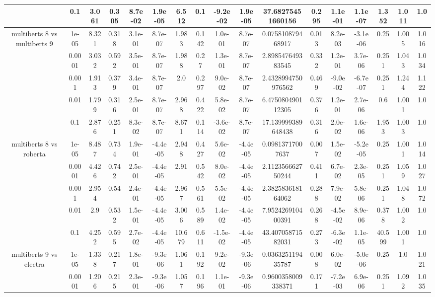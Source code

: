 \begin{tabular}{|c|c|c|c|c|c|c|c|c|c|c|c|c|c|c|c|c|}
 & 0.1 & 3.061 & 0.305 & 8.7e-02 & 1.9e-05 & 6.512 & 0.1 & -9.2e-02 & 1.9e-05 & 37.68275451660156 & 0.295 & 1.1e-01 & 1.1e-07 & 1.352 & 1.011 & 1.0 \\
\hline
\multirow{5}{*}{multiberts 8 vs multiberts 9} & 1e-05 & 8.321 & 0.318 & 3.1e-01 & 8.7e-07 & 1.983 & 0.142 & 1.0e-01 & 8.7e-07 & 0.075810879468917 & 0.013 & 8.2e-03 & -3.1e-06 & 0.25 & 1.005 & 1.016 \\
 & 0.0001 & 3.032 & 0.592 & 3.5e-01 & 8.7e-07 & 1.988 & 0.27 & 1.3e-01 & 8.7e-07 & 2.898547649383545 & 0.332 & 1.2e-01 & 3.7e-06 & 0.251 & 1.043 & 1.034 \\
 & 0.001 & 1.913 & 0.379 & 3.4e-01 & 8.7e-07 & 2.0 & 0.297 & 9.0e-02 & 8.7e-07 & 2.4328994750976562 & 0.469 & -9.0e-02 & -6.7e-07 & 0.251 & 1.244 & 1.122 \\
 & 0.01 & 1.799 & 0.316 & 2.5e-01 & 8.7e-07 & 2.968 & 0.422 & 5.8e-02 & 8.7e-07 & 6.475080490112305 & 0.376 & 1.2e-01 & 2.7e-06 & 0.6 & 1.001 & 1.0 \\
 & 0.1 & 2.876 & 0.251 & 8.3e-02 & 8.7e-07 & 8.671 & 0.114 & -3.6e-02 & 8.7e-07 & 17.139999389648438 & 0.316 & 2.0e-02 & 1.6e-06 & 1.953 & 1.003 & 1.0 \\
\hline
\multirow{5}{*}{multiberts 8 vs roberta } & 1e-05 & 8.487 & 0.734 & 1.9e-01 & -4.4e-05 & 2.948 & 0.427 & 5.6e-02 & -4.4e-05 & 0.09813717007637 & 0.007 & 1.5e-02 & -5.2e-05 & 0.25 & 1.001 & 1.014 \\
 & 0.0001 & 4.426 & 0.742 & 2.5e-01 & -4.4e-05 & 2.91 & 0.542 & 8.0e-02 & -4.4e-05 & 2.112356662750244 & 0.411 & 6.7e-02 & 2.3e-05 & 0.251 & 1.059 & 1.027 \\
 & 0.001 & 2.954 & 0.54 & 2.4e-01 & -4.4e-05 & 2.967 & 0.561 & 5.5e-02 & -4.4e-05 & 2.382583618164062 & 0.288 & 7.9e-02 & 5.8e-06 & 0.251 & 1.048 & 1.072 \\
 & 0.01 & 2.9 & 0.532 & 1.5e-01 & -4.4e-05 & 3.006 & 0.589 & 1.4e-02 & -4.4e-05 & 7.952426910400391 & 0.268 & -4.5e-02 & 8.9e-06 & 0.378 & 1.002 & 1.0 \\
 & 0.1 & 4.252 & 0.595 & 2.7e-02 & -4.4e-05 & 10.679 & 0.611 & -1.5e-02 & -4.4e-05 & 43.40705871582031 & 0.273 & -6.3e-02 & 1.1e-05 & 40.599 & 1.001 & 1.0 \\
\hline
\multirow{5}{*}{multiberts 9 vs electra } & 1e-05 & 1.338 & 0.217 & 1.8e-01 & -9.3e-06 & 1.061 & 0.192 & 9.2e-02 & -9.3e-06 & 0.036325119435787 & 0.008 & 6.0e-02 & -5.0e-06 & 0.25 & 1.0 & 1.021 \\
 & 0.0001 & 1.206 & 0.215 & 2.3e-01 & -9.3e-06 & 1.057 & 0.196 & 1.1e-01 & -9.3e-06 & 0.9600358009338371 & 0.171 & -7.2e-03 & 6.9e-06 & 0.251 & 1.092 & 1.035 \\

\end{tabular}
